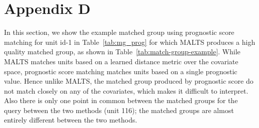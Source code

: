 \section*{Appendix D}
In this section, we show the example matched group using prognostic score matching for unit id-1 in Table~\ref{tab:mg_prog} for which MALTS produces a high quality matched group, as shown in Table~\ref{tab:match-group-example}. While MALTS matches units based on a learned distance metric over the covariate space, prognostic score matching matches units based on a single prognostic value. Hence unlike MALTS, the matched group produced by prognostic score do not match closely on any of the covariates, which makes it difficult to interpret. Also there is only one point in common between the matched groups for the query between the two methods (unit 116); the matched groups are almost entirely different between the two methods.



